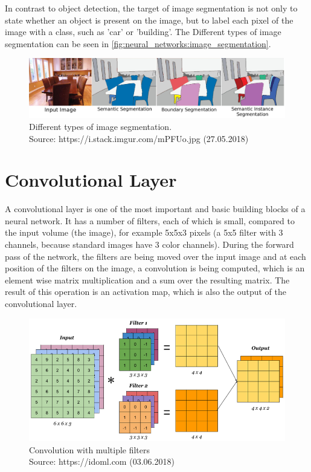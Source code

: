 In contrast to object detection, the target of image segmentation is not only to state whether an object is present on the image, but to label each pixel of the image with a class, such as 'car' or 'building'. The Different types of image segmentation can be seen in \autoref{fig:neural_networks:image_segmentation}.

\begin{figure}[H]
    \centering
	\includegraphics[width=0.8\linewidth]{chapters/neural_networks/images/segmentation.jpg}
	\caption{Different types of image segmentation.\\ Source: https://i.stack.imgur.com/mPFUo.jpg (27.05.2018)}
	\label{fig:neural_networks:image_segmentation}
\end{figure}

\section{Convolutional Layer}
A convolutional layer is one of the most important and basic building blocks of a neural network. It has a number of filters, each of which is small, compared to the input volume (the image), for example 5x5x3 pixels (a 5x5 filter with 3 channels, because standard images have 3 color channels). During the forward pass of the network, the filters are being moved over the input image and at each position of the filters on the image, a convolution is being computed, which is an element wise matrix multiplication and a sum over the resulting matrix. The result of this operation is an activation map, which is also the output of the convolutional layer.

\begin{figure}[H]
    \centering
	\includegraphics[width=0.8\linewidth]{chapters/neural_networks/images/convolution-with-multiple-filters.png}
	\caption{Convolution with multiple filters\\ Source: https://idoml.com (03.06.2018)}
	\label{fig:neural_networks:convolution_with_multiple_filters}
\end{figure}

